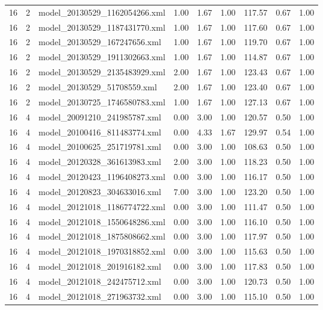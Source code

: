 \begin{table}[ht]
\begin{tabular}{rrlrrrrrr}
   16 &   2 & model\_20130529\_1162054266.xml & 1.00 & 1.67 & 1.00 & 117.57 & 0.67 & 1.00 \\ 
   16 &   2 & model\_20130529\_1187431770.xml & 1.00 & 1.67 & 1.00 & 117.60 & 0.67 & 1.00 \\ 
   16 &   2 & model\_20130529\_167247656.xml & 1.00 & 1.67 & 1.00 & 119.70 & 0.67 & 1.00 \\ 
   16 &   2 & model\_20130529\_1911302663.xml & 1.00 & 1.67 & 1.00 & 114.87 & 0.67 & 1.00 \\ 
   16 &   2 & model\_20130529\_2135483929.xml & 2.00 & 1.67 & 1.00 & 123.43 & 0.67 & 1.00 \\ 
   16 &   2 & model\_20130529\_51708559.xml & 2.00 & 1.67 & 1.00 & 123.40 & 0.67 & 1.00 \\ 
   16 &   2 & model\_20130725\_1746580783.xml & 1.00 & 1.67 & 1.00 & 127.13 & 0.67 & 1.00 \\ 
   16 &   4 & model\_20091210\_241985787.xml & 0.00 & 3.00 & 1.00 & 120.57 & 0.50 & 1.00 \\ 
   16 &   4 & model\_20100416\_811483774.xml & 0.00 & 4.33 & 1.67 & 129.97 & 0.54 & 1.00 \\ 
   16 &   4 & model\_20100625\_251719781.xml & 0.00 & 3.00 & 1.00 & 108.63 & 0.50 & 1.00 \\ 
   16 &   4 & model\_20120328\_361613983.xml & 2.00 & 3.00 & 1.00 & 118.23 & 0.50 & 1.00 \\ 
   16 &   4 & model\_20120423\_1196408273.xml & 0.00 & 3.00 & 1.00 & 116.17 & 0.50 & 1.00 \\ 
   16 &   4 & model\_20120823\_304633016.xml & 7.00 & 3.00 & 1.00 & 123.20 & 0.50 & 1.00 \\ 
   16 &   4 & model\_20121018\_1186774722.xml & 0.00 & 3.00 & 1.00 & 111.47 & 0.50 & 1.00 \\ 
   16 &   4 & model\_20121018\_1550648286.xml & 0.00 & 3.00 & 1.00 & 116.10 & 0.50 & 1.00 \\ 
   16 &   4 & model\_20121018\_1875808662.xml & 0.00 & 3.00 & 1.00 & 117.97 & 0.50 & 1.00 \\ 
   16 &   4 & model\_20121018\_1970318852.xml & 0.00 & 3.00 & 1.00 & 115.63 & 0.50 & 1.00 \\ 
   16 &   4 & model\_20121018\_201916182.xml & 0.00 & 3.00 & 1.00 & 117.83 & 0.50 & 1.00 \\ 
   16 &   4 & model\_20121018\_242475712.xml & 0.00 & 3.00 & 1.00 & 120.73 & 0.50 & 1.00 \\ 
   16 &   4 & model\_20121018\_271963732.xml & 0.00 & 3.00 & 1.00 & 115.10 & 0.50 & 1.00 \\ 

\end{tabular}
\end{table}
